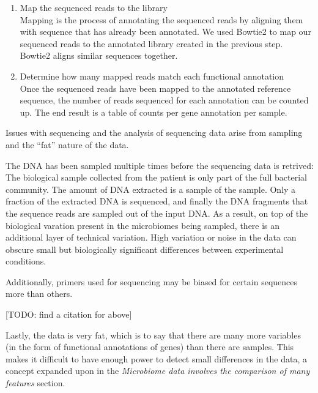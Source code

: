 \begin{enumerate}
\item Map the sequenced reads to the library\\
Mapping is the process of annotating the sequenced reads by aligning them with sequence that has already been annotated. We used Bowtie2 \cite{langmead2012fast} to map our sequenced reads to the annotated library created in the previous step. Bowtie2 aligns similar sequences together.

\item Determine how many mapped reads match each functional annotation\\
Once the sequenced reads have been mapped to the annotated reference sequence, the number of reads sequenced for each annotation can be counted up. The end result is a table of counts per gene annotation per sample.
\end{enumerate}

Issues with sequencing and the analysis of sequencing data arise from sampling and the ``fat'' nature of the data.

The DNA has been sampled multiple times before the sequencing data is retrived: The biological sample collected from the patient is only part of the full bacterial community. The amount of DNA extracted is a sample of the sample. Only a fraction of the extracted DNA is sequenced, and finally the DNA fragments that the sequence reads are sampled out of the input DNA. As a result, on top of the biological varation present in the microbiomes being sampled, there is an additional layer of technical variation. High variation or noise in the data can obscure small but biologically significant differences between experimental conditions.

Additionally, primers used for sequencing may be biased for certain sequences more than others.

[TODO: find a citation for above]

Lastly, the data is very fat, which is to say that there are many more variables (in the form of functional annotations of genes) than there are samples. This makes it difficult to have enough power to detect small differences in the data, a concept expanded upon in the \textit{Microbiome data involves the comparison of many features} section.

\FloatBarrier

